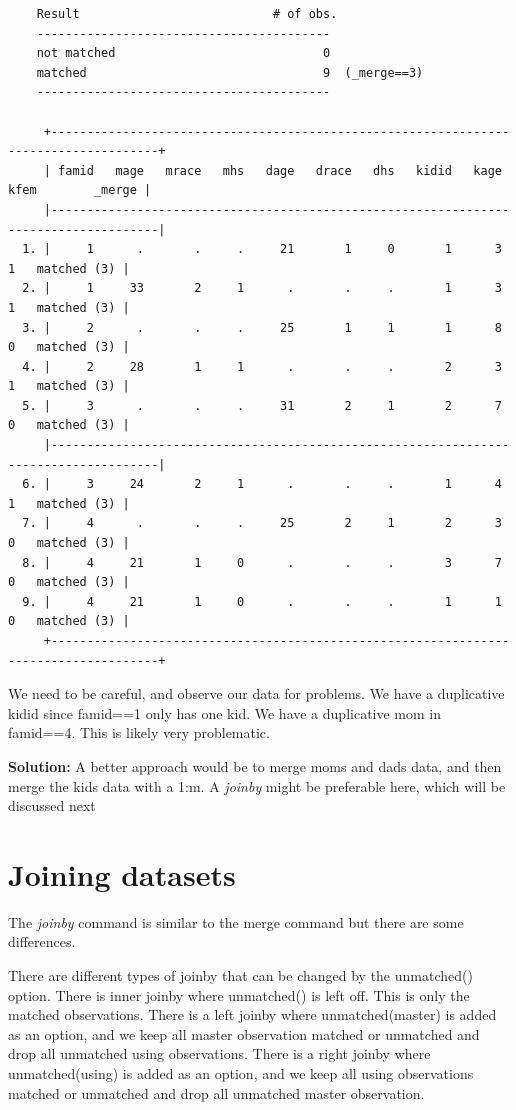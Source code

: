 \documentclass[
]{book}
\begin{document}
\begin{verbatim}
    Result                           # of obs.
    -----------------------------------------
    not matched                             0
    matched                                 9  (_merge==3)
    -----------------------------------------

     +-------------------------------------------------------------------------------------+
     | famid   mage   mrace   mhs   dage   drace   dhs   kidid   kage   kfem        _merge |
     |-------------------------------------------------------------------------------------|
  1. |     1      .       .     .     21       1     0       1      3      1   matched (3) |
  2. |     1     33       2     1      .       .     .       1      3      1   matched (3) |
  3. |     2      .       .     .     25       1     1       1      8      0   matched (3) |
  4. |     2     28       1     1      .       .     .       2      3      1   matched (3) |
  5. |     3      .       .     .     31       2     1       2      7      0   matched (3) |
     |-------------------------------------------------------------------------------------|
  6. |     3     24       2     1      .       .     .       1      4      1   matched (3) |
  7. |     4      .       .     .     25       2     1       2      3      0   matched (3) |
  8. |     4     21       1     0      .       .     .       3      7      0   matched (3) |
  9. |     4     21       1     0      .       .     .       1      1      0   matched (3) |
     +-------------------------------------------------------------------------------------+
\end{verbatim}

We need to be careful, and observe our data for problems. We have a duplicative kidid since famid==1 only has one kid. We have a duplicative mom in famid==4. This is likely very problematic.

\textbf{Solution:}
A better approach would be to merge moms and dads data, and then merge the kids data with a 1:m.
A \emph{joinby} might be preferable here, which will be discussed next

\section{Joining datasets}\label{joining-datasets}

The \emph{joinby} command is similar to the merge command but there are some differences.

There are different types of joinby that can be changed by the unmatched() option.
There is inner joinby where unmatched() is left off. This is only the
matched observations.
There is a left joinby where unmatched(master) is added as an option, and we
keep all master observation matched or unmatched and drop all unmatched
using observations.
There is a right joinby where unmatched(using) is added as an option, and we
keep all using observations matched or unmatched and drop all unmatched
master observation.
\end{document}
